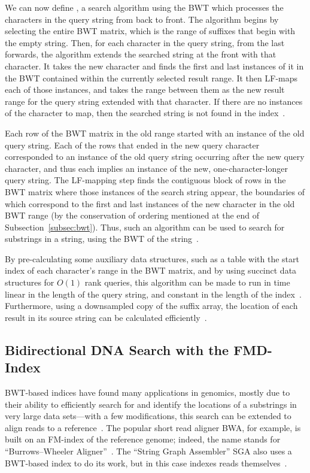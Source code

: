 We can now define , a search algorithm using the BWT which processes the characters in the query string from back to front. The algorithm begins by selecting the entire BWT matrix, which is the range of suffixes that begin with the empty string. Then, for each character in the query string, from the last forwards, the algorithm extends the searched string at the front with that character. It takes the new character and finds the first and last instances of it in the BWT contained within the currently selected result range. It then LF-maps each of those instances, and takes the range between them as the new result range for the query string extended with that character. If there are no instances of the character to map, then the searched string is not found in the index~\cite{ferragina2000opportunistic}.

Each row of the BWT matrix in the old range started with an instance of the old query string. Each of the rows that ended in the new query character corresponded to an instance of the old query string occurring after the new query character, and thus each implies an instance of the new, one-character-longer query string. The LF-mapping step finds the contiguous block of rows in the BWT matrix where those instances of the search string appear, the boundaries of which correspond to the first and last instances of the new character in the old BWT range (by the conservation of ordering mentioned at the end of Subsection~\ref{subsec:bwt}). Thus, such an algorithm can be used to search for substrings in a string, using the BWT of the string~\cite{ferragina2000opportunistic}.

By pre-calculating some auxiliary data structures, such as a table with the start index of each character's range in the BWT matrix, and by using succinct data structures for $O(1)$ rank queries, this algorithm can be made to run in time linear in the length of the query string, and constant in the length of the index~\cite{ferragina2000opportunistic}. Furthermore, using a downsampled copy of the suffix array, the location of each result in its source string can be calculated efficiently~\cite{siren2009run}.

\subsection{Bidirectional DNA Search with the FMD-Index}

BWT-based indices have found many applications in genomics, mostly due to their ability to efficiently search for and identify the locations of a substrings in very large data sets---with a few modifications, this search can be extended to align reads to a reference~\cite{li2014bwa}. The popular short read aligner BWA, for example, is built on an FM-index of the reference genome; indeed, the name stands for ``Burrows--Wheeler Aligner''~\cite{li2014bwa,li2009fast}. The ``String Graph Assembler'' SGA also uses a BWT-based index to do its work, but in this case indexes reads themselves~\cite{simpson2012efficient}.

